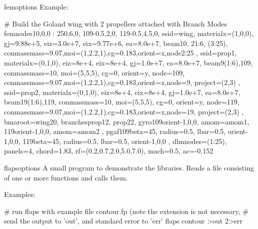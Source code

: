 \begin{cmdref}{fem}{options}
Example:
\begin{example}
   # Build the Goland wing with 2 propellers attached with Branch Modes
   fem{nodes{1{0,0,0} : 25{0,6,0}, 109{-0.5,2,0}, 119{-0.5,4.5,0}},
      ss{id=wing,
         material{x=(1,0,0), gj=9.88e+5, eiz=3.0e+7,
            eix=9.77e+6, ea=8.0e+7},
         beam{1{0}, 2{1:6}, (3:25)},
         conmass{mass=9.07,moi=(1,2.2,1),cg=0.183,orient=x,node{2:25}} 
      },
      ss{id=prop1,
         material{x=(0,1,0), eiz=8e+4, eix=8e+4,
            gj=1.0e+7, ea=8.0e+7},
         beam{9{(1:6)},109},
         conmass{mass=10, moi=(5,5,5), cg=0, orient=y, node=109},
         conmass{mass=9.07,moi=(1,2.2,1),cg=0.183,orient=x,node=9},
         project=(2,3) },
      ss{id=prop2,
         material{x=(0,1,0), eiz=8e+4, eix=8e+4,
            gj=1.0e+7, ea=8.0e+7},
         beam{19{(1:6)},119},
         conmass{mass=10, moi=(5,5,5), cg=0, orient=y, node=119},
         conmass{mass=9.07,moi=(1,2.2,1),cg=0.183,orient=x,node=19},
         project=(2,3) },
      bma{root=wing{20}, branches{prop1{2}, prop2{2}}},
      gyro{109{orient{-1,0,0}, amom=amom1},
           119{orient{-1,0,0}, amom=amom2} },
      pgaf{109{beta=45, radius=0.5, lbar=0.5, orient{-1,0,0}},
           119{beta=45, radius=0.5, lbar=0.5, orient{-1,0,0}} },
      dlm{nodes=(1:25), panels=4, chord=1.83,
          rf=(0.2,0.7,2.0,5.0,7.0), mach=0.5, ac=-0.152 }
   }
\end{example}

\end{cmdref}


\begin{cmdref}{flaps}{options}
A small program to demonstrate the \Flaps libraries.
Reads a file consisting of one or more \Flaps functions and calls them.

\begin{subopts}
\end{subopts}

Examples:
\begin{example}
# run flaps with example file contour.fp (note the extension is not necessary,
# send the output to 'out', and standard error to 'err'
flaps contour >out 2>err
\end{example}

\end{cmdref}

